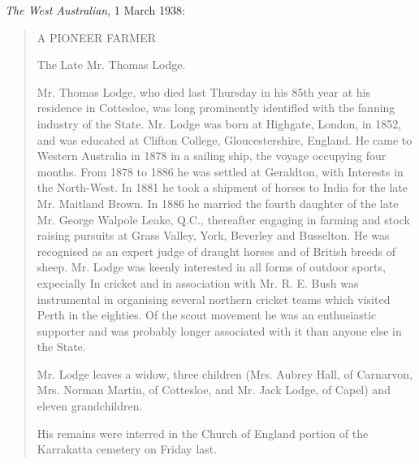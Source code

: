 
\emph{The West Australian}, 1 March 1938:\cite{PioneerFarmer1938}

\begin{quotation}
A PIONEER FARMER

The Late Mr. Thomas Lodge.

Mr. Thomas Lodge, who died last Thursday in his 85th year at his residence in Cottesloe,
was long prominently identifled with the fanning industry of the State.
Mr. Lodge was born at Highgate, London, in 1852, and was educated at Clifton College, Gloucestershire, England.
He came to Western Australia in 1878 in a sailing ship, the voyage occupying four months.
From 1878 to 1886 he was settled at Geraldton, with Interests in the North-West.
In 1881 he took a shipment of horses to India for the late Mr. Maitland Brown.
In 1886 he married the fourth daughter of the late Mr. George Walpole Leake, Q.C., thereafter engaging
in farming and stock raising pursuits at Grass Valley, York, Beverley and Busselton.
He was recognised as an expert judge of draught horses and of British breeds of sheep.
Mr. Lodge was keenly interested in all forms of outdoor sports, expecially In cricket and in association
with Mr. R. E. Bush was instrumental in organising several northern cricket teams which visited Perth in the eighties.
Of the scout movement he was an enthusiastic supporter and was probably longer associated with it than anyone else in the State.

Mr. Lodge leaves a widow, three children (Mrs. Aubrey Hall, of Carnarvon,
Mrs. Norman Martin, of Cottesloe, and Mr. Jack Lodge, of Capel) and eleven grandchildren.

His remains were interred in the Church of England portion of the Karrakatta cemetery on Friday last.
\end{quotation}
